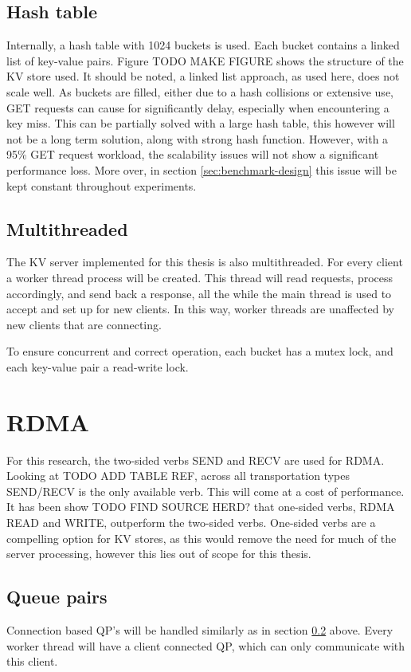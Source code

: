 \subsection{Hash table}
Internally, a hash table with 1024 buckets is used.
Each bucket contains a linked list of key-value pairs.
Figure TODO MAKE FIGURE shows the structure of the KV store used.
It should be noted, a linked list approach, as used here, does not scale well.
As buckets are filled, either due to a hash collisions or extensive use, GET requests can cause for significantly delay, especially when encountering a key miss.
This can be partially solved with a large hash table, this however will not be a long term solution, along with strong hash function.
However, with a 95\% GET request workload, the scalability issues will not show a significant performance loss.
More over, in section \ref{sec:benchmark-design} this issue will be kept constant throughout experiments.

\subsection{Multithreaded}\label{subsec:multithreaded}
The KV server implemented for this thesis is also multithreaded.
For every client a worker thread process will be created.
This thread will read requests, process accordingly, and send back a response, all the while the main thread is used to accept and set up for new clients.
In this way, worker threads are unaffected by new clients that are connecting.

To ensure concurrent and correct operation, each bucket has a mutex lock, and each key-value pair a read-write lock.

\section{RDMA}
For this research, the two-sided verbs SEND and RECV are used for RDMA.
Looking at TODO ADD TABLE REF, across all transportation types SEND/RECV is the only available verb.
This will come at a cost of performance.
It has been show TODO FIND SOURCE HERD? that one-sided verbs, RDMA READ and WRITE, outperform the two-sided verbs.
One-sided verbs are a compelling option for KV stores, as this would remove the need for much of the server processing, however this lies out of scope for this thesis.

\subsection{Queue pairs}
Connection based QP's will be handled similarly as in section \ref{subsec:multithreaded} above.
Every worker thread will have a client connected QP, which can only communicate with this client.

